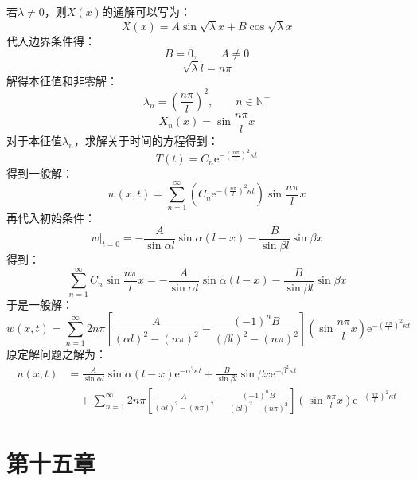 \documentclass[fontset=windows]{ctexart}
\begin{document}
\begin{itemize}
    若$\lambda \neq 0$，则$X(x)$的通解可以写为：
    \[
    X(x) = A\sin\sqrt\lambda x + B\cos\sqrt\lambda x
    \]
    代入边界条件得：
    \[
    B = 0,\qquad
    A \neq 0
    \]
    \[
    \sqrt{\lambda}l = n\pi
    \]
    解得本征值和非零解：
    \[
    \lambda_n = \left(\frac{n\pi}{l}\right)^{2},\qquad
    n\in\mathbb{N^+}
    \]
    \[
    X_n(x) = \sin\frac{n\pi}{l}x
    \]
    对于本征值$\lambda_n$，求解关于时间的方程得到：
    \[
    T(t) = C_n\mathrm{e}^{-\left(\tfrac{n\pi}{l}\right)^{2}\kappa t}
    \]
    得到一般解：
    \[
    w(x,t) = \sum_{n = 1}^{\infty}\left(C_n\mathrm{e}^{-\left(\tfrac{n\pi}{l}\right)^{2}\kappa t}\right)\sin\frac{n\pi}{l}x
    \]
    再代入初始条件：
    \[
    \left.w\right|_{t=0} = -\frac{A}{\sin\alpha l}\sin\alpha(l - x) - \frac{B}{\sin\beta l}\sin\beta x
    \]
    得到：
    \[
    \sum_{n = 1}^{\infty}C_n\sin\frac{n\pi}{l}x = -\frac{A}{\sin\alpha l}\sin\alpha(l - x) - \frac{B}{\sin\beta l}\sin\beta x
    \]
    于是一般解：
    \[
    w(x,t) = \sum_{n = 1}^{\infty}2n\pi\left[\frac{A}{(\alpha l)^2-(n\pi)^2} - \frac{(-1)^nB}{(\beta l)^2-(n\pi)^2}\right]\left(\sin\frac{n\pi}{l}x\right)\mathrm{e}^{-\left(\tfrac{n\pi}{l}\right)^{2}\kappa t}
    \]
    原定解问题之解为：
    \begin{align*}
    u(x,t)
    &= \frac{A}{\sin\alpha l}\sin\alpha(l - x)\mathrm{e}^{-\alpha^2\kappa t} + \frac{B}{\sin\beta l}\sin\beta x\mathrm{e}^{-\beta^2\kappa t} \\
    &\quad + \sum_{n = 1}^{\infty}2n\pi\left[\frac{A}{(\alpha l)^2-(n\pi)^2} - \frac{(-1)^nB}{(\beta l)^2-(n\pi)^2}\right]\left(\sin\frac{n\pi}{l}x\right)\mathrm{e}^{-\left(\tfrac{n\pi}{l}\right)^{2}\kappa t}
    \end{align*}

\end{itemize}

\newpage
\section*{第十五章}
\end{document}
